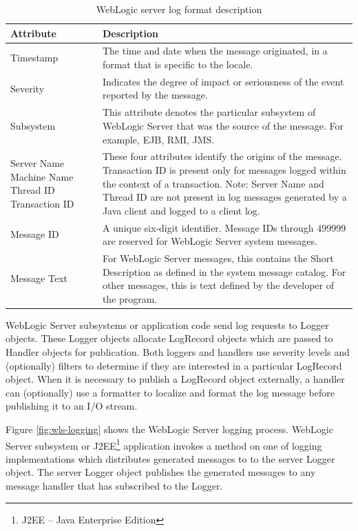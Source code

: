 \documentclass[thesis=M,english]{FITthesis}[2019/12/23]
\begin{document}
\begin{table}\centering
	\caption{WebLogic server log format description}\label{tab:log-format}
	\begin{tabular}{ |m{7em}|m{9cm}| }
		\hline
		\textbf{Attribute} & \textbf{Description}\\
		\hline
		Timestamp & The time and date when the message originated, in a format that is specific to the locale.\\
		\hline
		Severity & Indicates the degree of impact or seriousness of the event reported by the message.\\
		\hline
		Subsystem &	This attribute denotes the particular subsystem of WebLogic Server that was the source of the message. For example, EJB, RMI, JMS.\\
		\hline
		Server Name \newline
		Machine Name \newline
		Thread ID \newline
		Transaction ID & These four attributes identify the origins of the message. Transaction ID is present only for messages logged within the context of a transaction. Note: Server Name and Thread ID are not present in log messages generated by a Java client and logged to a client log.\\
		\hline
		Message ID & A unique six-digit identifier. Message IDs through 499999 are reserved for WebLogic Server system messages.\\
		\hline
		Message Text & For WebLogic Server messages, this contains the Short Description as defined in the system message catalog. For other messages, this is text defined by the developer of the program.\\
		\hline
	\end{tabular}
\end{table}
WebLogic Server subsystems or application code send log requests to Logger objects. These Logger objects allocate LogRecord objects which are passed to Handler objects for publication. Both loggers and handlers use severity levels and (optionally) filters to determine if they are interested in a particular LogRecord object. When it is necessary to publish a LogRecord object externally, a handler can (optionally) use a formatter to localize and format the log message before publishing it to an I/O stream. 

Figure \ref{fig:wls-logging} shows the WebLogic Server logging process. WebLogic Server subsystem or J2EE\footnote{J2EE -- Java Enterprise Edition} application invokes a method on one of logging implementations which distributes generated messages to to the server Logger object. The server Logger object publishes the generated messages to any message handler that has subscribed to the Logger.
\end{document}
